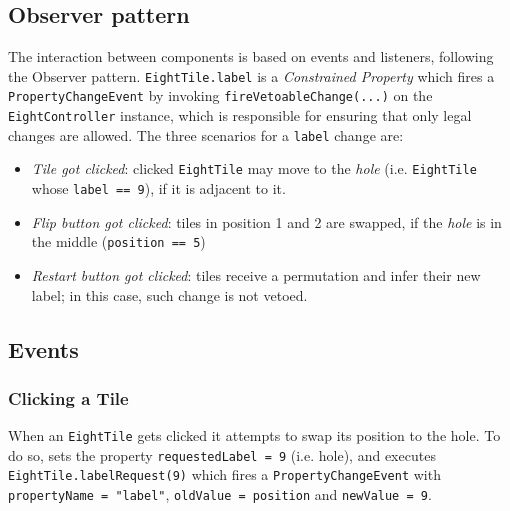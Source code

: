 \subsection{Observer pattern}

The interaction between components is based on events and listeners, following the Observer pattern.
\lstinline|EightTile.label| is a \textit{Constrained Property} which fires a \lstinline|PropertyChangeEvent| by invoking \lstinline|fireVetoableChange(...)| on the \lstinline|EightController| instance, which is responsible for ensuring that only legal changes are allowed.
The three scenarios for a \lstinline|label| change are:
\begin{itemize}
   \item \textit{Tile got clicked}: clicked \lstinline|EightTile| may move to the \textit{hole} (i.e. \lstinline|EightTile| whose \lstinline|label == 9|), if it is adjacent to it.
   \item \textit{Flip button got clicked}: tiles in position 1 and 2 are swapped, if the \textit{hole} is in the middle (\lstinline|position == 5|) 
   \item \textit{Restart button got clicked}: tiles receive a permutation and infer their new label; in this case, such change is not vetoed.
\end{itemize} 

\subsection{Events}
\subsubsection{Clicking a Tile}
When an \lstinline|EightTile| gets clicked it attempts to swap its position to the hole. To do so, sets the property \lstinline|requestedLabel = 9| (i.e. hole), and executes \lstinline|EightTile.labelRequest(9)| which fires a \lstinline|PropertyChangeEvent| with \lstinline|propertyName = "label"|, \lstinline|oldValue = position| and \lstinline|newValue = 9|.

